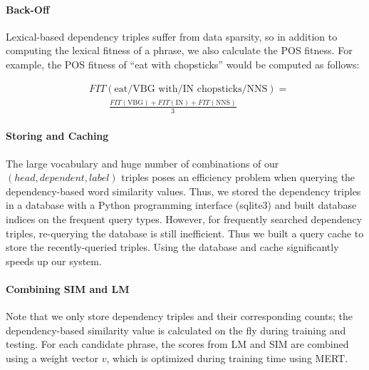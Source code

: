 \documentclass[11pt]{article}
\begin{document}
\paragraph{Back-Off}
Lexical-based dependency triples suffer from data sparsity, so in addition to computing the lexical fitness of a phrase, we also calculate the POS fitness. For example, the POS fitness of ``eat with chopsticks'' would be computed as follows:

\begin{align}
& FIT(\mbox{eat/VBG with/IN chopsticks/NNS}) = \nonumber \\
 & \qquad \frac{FIT(\mbox{VBG}) + FIT(\mbox{IN}) + FIT(\mbox{NNS})}{3} 
\end{align}



\paragraph{Storing and Caching}
The large vocabulary and huge number of combinations of our $(head, dependent, label)$ triples poses an efficiency problem when querying the dependency-based word similarity values. Thus, we stored the dependency triples in a database with a Python programming interface (sqlite3) and built database indices on the frequent query types. However, for frequently searched dependency triples, re-querying the database is still inefficient. Thus we built a query cache to store the recently-queried triples. Using the database and cache significantly speeds up our system. 


\paragraph{Combining SIM and LM}
Note that we only store dependency triples and their corresponding counts; the dependency-based similarity value is calculated on the fly during training and testing. For each candidate phrase, the scores from LM and SIM are combined using a weight vector $v$, which is optimized during training time using MERT. 
\end{document}

